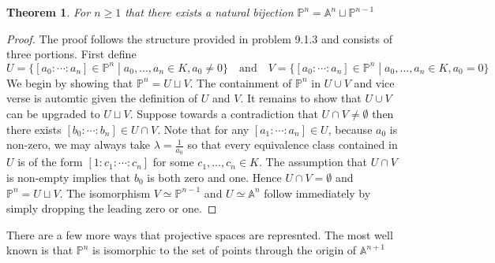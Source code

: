 \documentclass[40pt]{article}
\newtheorem{theorem}{Theorem}[section]
\newcommand{\Proj}{\mathbb{P}}
\newcommand{\A}{\mathbb{A}}
\theoremstyle{remark}
\begin{document}
\begin{theorem}
	For $n \geq 1$ that there exists a natural bijection $\Proj^n = \A^{n} \sqcup \Proj^{n-1}$
\end{theorem}
\begin{proof}
	The proof follows the structure provided in problem 9.1.3 and consists of three portions. First define
	\[
	U = \{[a_0:\cdots:a_n] \in \Proj^n\; | \; a_0,\dots,a_n \in K, a_0 \neq 0\} \quad\text{and}\quad V = \{[a_0:\cdots:a_n]\in\Proj^n\; | \; a_0,\dots,a_n \in K, a_0 = 0\}
	\]
	We begin by showing that $\Proj^n = U \sqcup V$. The containment of $\Proj^n$ in $U \cup V$ and vice verse is automtic given the definition of $U$ and $V$. It remains to show that $U\cup V$ can be upgraded to $U \sqcup V$. Suppose towards a contradiction that $U \cap V\neq\emptyset$ then there exists $[b_0:\cdots:b_n] \in U \cap V$. Note that for any $[a_1:\cdots:a_n] \in U$, because $a_0$ is non-zero, we may always take $\lambda = \frac{1}{a_0}$ so that every equivalence class contained in $U$ is of the form $[1:c_1:\cdots:c_n]$ for some $c_1,\dots,c_n \in K$. The assumption that $U \cap V$ is non-empty implies that $b_0$ is both zero and one. Hence $U \cap V = \emptyset$ and $\Proj^n = U \sqcup V$. The isomorphism $V \simeq \Proj^{n-1}$ and $U \simeq \A^n$ follow immediately by simply dropping the leading zero or one.
	\end{proof}
There are a few more ways that projective spaces are represnted. The most well known is that $\Proj^{n}$ is isomorphic to the set of points through the origin of $\A^{n+1}$
\end{document}
